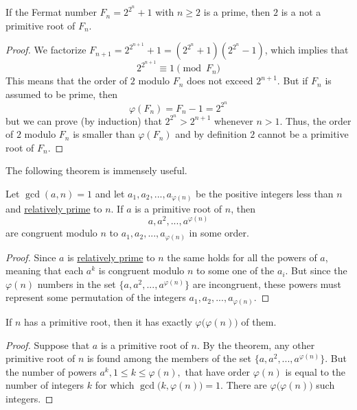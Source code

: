 \documentclass{article}
\newcounter{theorem}[section]
\newcounter{definition}[section]
\begin{document}
\begin{theorem}
  \label{thm:2-is-not-a-primitive-root-of-a-prime-fermat}
If the Fermat number $F_n = 2^{2^n} + 1$ with $n\geq 2$ is a prime, then $2$ is a not a primitive root of $F_n$. 
\end{theorem}
\begin{proof}
We factorize $F_{n+1} = 2^{2^{n+1}} + 1 = (2^{2^n} + 1)(2^{2^n} - 1)$, which implies that
\begin{equation}
  2^{2^{n+1}} \equiv 1 \pmod{F_n}
\end{equation}
This means that the order of $2$ modulo $F_n$ does not exceed $2^{n+1}$. But if $F_n$ is assumed to be prime, then
\begin{equation}
  \varphi(F_n) = F_n - 1 = 2^{2^n}
\end{equation}
but we can prove (by induction) that $2^{2^n} > 2^{n+1}$ whenever $n>1$. Thus, the order of $2$ modulo $F_n$ is smaller than $\varphi(F_n)$ and by definition $2$ cannot be a primitive root of $F_n$. 
\end{proof}

The following theorem is immensely useful. 

\begin{theorem}
  \label{thm:powers-of-a-primitive-root-form-a-reduced}
Let $\gcd(a, n) = 1$ and let $a_1, a_2, ..., a_{\varphi(n)}$ be the positive integers less than $n$ and \hyperref[def:relatively-prime]{relatively prime} to $n$. If $a$ is a primitive root of $n$, then 
\begin{equation}
  a, a^2, ..., a^{\varphi(n)}
\end{equation}
are congruent modulo $n$ to $a_1, a_2, ..., a_{\varphi(n)}$ in some order. 
\end{theorem}
\begin{proof}
Since $a$ is \hyperref[def:relatively-prime]{relatively prime} to $n$ the same holds for all the powers of $a$, meaning that each $a^k$ is congruent modulo $n$ to some one of the $a_i$. But since the $\varphi(n)$ numbers in the set $\{a, a^2, ..., a^{\varphi(n)}\}$ are incongruent, these powers must represent some permutation of the integers $a_1, a_2, ..., a_{\varphi(n)}$. 
\end{proof}

\begin{corollary}
  \label{thm:number-of-primitive-roots}
If $n$ has a primitive root, then it has exactly $\varphi \big( \varphi(n) \big)$ of them. 
\end{corollary}
\begin{proof}
Suppose that $a$ is a primitive root of $n$. By the theorem, any other primitive root of $n$ is found among the members of the set $\{a, a^2, ..., a^{\varphi(n)}\}$. But the number of powers $a^k, 1 \leq k \leq \varphi(n),$ that have order $\varphi(n)$ is equal to the number of integers $k$ for which $\gcd\big(k, \varphi(n)\big) = 1$. There are $\varphi\big( \varphi(n)\big)$ such integers. 
\end{proof}
\end{document}
